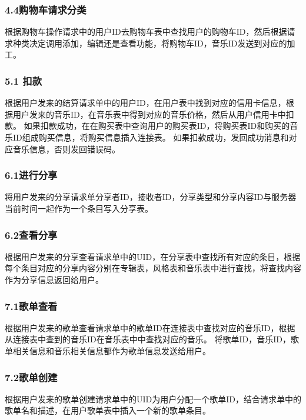 \subsubsection{4.4购物车请求分类}

根据购物车操作请求中的用户ID去购物车表中查找用户的购物车ID，然后根据请求种类决定调用添加，编辑还是查看功能，将购物车ID，音乐ID发送到对应的加工。

\subsubsection{5.1 扣款 }

根据用户发来的结算请求单中的用户ID，在用户表中找到对应的信用卡信息，根据用户发来的音乐ID，在音乐表中得到对应的音乐价格，然后从用户信用卡中扣款。
如果扣款成功，在在购买表中查询用户的购买表ID，将购买表ID和购买的音乐ID组成购买信息，将购买信息插入连接表。
如果扣款成功，发回成功消息和对应音乐信息，否则发回错误码。

\subsubsection{6.1进行分享}

将用户发来的分享请求单分享者ID，接收者ID，分享类型和分享内容ID与服务器当前时间一起作为一个条目写入分享表。

\subsubsection{6.2查看分享}

根据用户发来的分享查看请求单中的UID，在分享表中查找所有对应的条目，根据每个条目对应的分享内容分别在专辑表，风格表和音乐表中进行查找，将查找内容作为分享信息返回给用户。

\subsubsection{7.1歌单查看}

根据用户发来的歌单查看请求单中的歌单ID在连接表中查找对应的音乐ID，根据从连接表中查到的音乐ID在音乐表中中查找对应的音乐。
将歌单ID，音乐ID，歌单相关信息和音乐相关信息都作为歌单信息发送给用户。


\subsubsection{7.2歌单创建}

根据用户发来的歌单创建请求单中的UID为用户分配一个歌单ID，结合请求单中的歌单名和描述，在用户歌单表中插入一个新的歌单条目。


